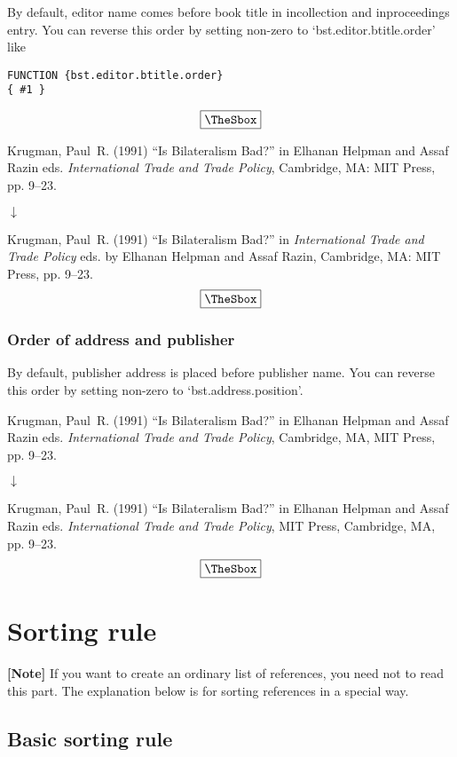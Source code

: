 \documentclass[10pt]{article}
\newenvironment{Frame}%
{\setlength{\fboxsep}{15pt}
\setlength{\mylength}{\linewidth}%
\addtolength{\mylength}{-2\fboxsep}%
\addtolength{\mylength}{-2\fboxrule}%
\Sbox
\minipage{\mylength}%
\setlength{\abovedisplayskip}{0pt}%
\setlength{\belowdisplayskip}{0pt}%
}%
{\endminipage\endSbox
\[\fbox{\TheSbox}\]}
\begin{document}
By default, editor name comes before book title in incollection and
inproceedings entry. You can reverse this order by
setting non-zero to `bst.editor.btitle.order' like
\begin{Frame}
\begin{verbatim}
FUNCTION {bst.editor.btitle.order}
{ #1 }
\end{verbatim}
\end{Frame}


\begin{Frame}
Krugman, Paul~R. (1991) ``Is Bilateralism Bad?'' in Elhanan Helpman and Assaf
  Razin eds.  {\it International Trade and Trade Policy}, Cambridge, MA: MIT
  Press, pp. 9--23.
\begin{center}
 $\downarrow$
\end{center} 
Krugman, Paul~R. (1991) ``Is Bilateralism Bad?'' in  {\it International Trade
and Trade Policy}  eds. by Elhanan Helpman and Assaf Razin, Cambridge, MA:
MIT Press, pp. 9--23.
\end{Frame}

\subsubsection{Order of address and publisher}

By default, publisher address is placed before publisher name.  You can
reverse this order by setting non-zero to `bst.address.position'.
\begin{Frame}
Krugman, Paul~R. (1991) ``Is Bilateralism Bad?'' in Elhanan Helpman and
  Assaf Razin eds.  {\it International Trade and Trade Policy},
  Cambridge, MA, MIT Press, pp. 9--23.
\begin{center}
 $\downarrow$
\end{center} 
Krugman, Paul~R. (1991) ``Is Bilateralism Bad?'' in Elhanan Helpman and Assaf
  Razin eds.   {\it International Trade and Trade Policy}, MIT Press,
  Cambridge, MA, pp. 9--23.
\end{Frame}


\section{Sorting rule}
\label{sec:sort_rule}

\noindent \textbf{[Note]} If you want to create an ordinary list of
references, you need not to read this part.  The explanation below is
for sorting references in a special way.

\subsection{Basic sorting rule}
\end{document}
